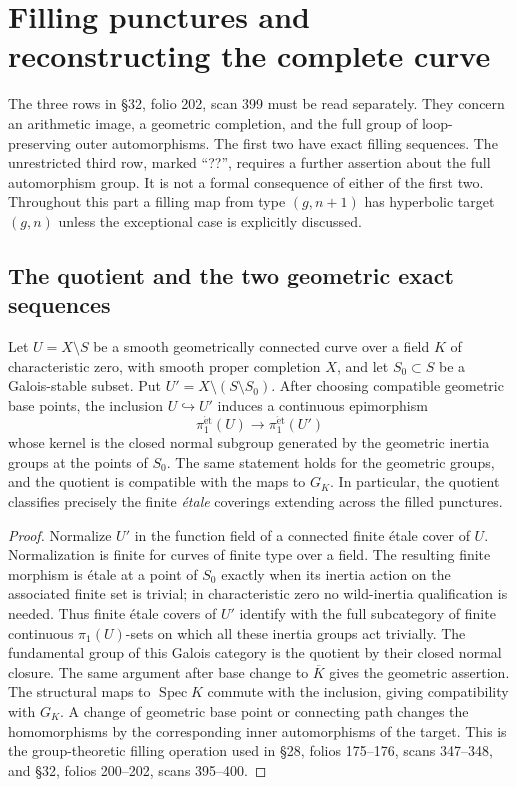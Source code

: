 \section{Filling punctures and reconstructing the complete curve}\label{part:C}

The three rows in \S32, folio 202, scan 399 must be read separately.
They concern an arithmetic image, a geometric completion, and the
full group of loop-preserving outer automorphisms.  The first two
have exact filling sequences.  The unrestricted third row, marked
``??'', requires a further assertion about the full automorphism
group.  It is not a formal consequence of either of the first two.
Throughout this part a filling map from type $(g,n+1)$ has hyperbolic
target $(g,n)$ unless the exceptional case is explicitly discussed.

\subsection{The quotient and the two geometric exact sequences}

Let $U=X\setminus S$ be a smooth geometrically connected curve over
a field $K$ of characteristic zero, with smooth proper completion
$X$, and let $S_0\subset S$ be a Galois-stable subset.  Put
$U'=X\setminus(S\setminus S_0)$.  After choosing compatible
geometric base points, the inclusion $U\hookrightarrow U'$ induces
a continuous epimorphism
\[
 \pi_1^{\mathrm{\acute et}}(U)\longrightarrow
 \pi_1^{\mathrm{\acute et}}(U')
\]
whose kernel is the closed normal subgroup generated by the
geometric inertia groups at the points of $S_0$.  The same statement
holds for the geometric groups, and the quotient is compatible
with the maps to $G_K$.  In particular, the quotient classifies
precisely the finite \emph{\'etale} coverings extending across the
filled punctures.

\begin{proof}
Normalize $U'$ in the function field of a connected finite \'etale
cover of $U$.  Normalization is finite for curves of finite type
over a field.  The resulting finite morphism is \'etale at a point
of $S_0$ exactly when its inertia action on the associated finite
set is trivial; in characteristic zero no wild-inertia qualification
is needed.  Thus finite \'etale covers of $U'$ identify with the
full subcategory of finite continuous $\pi_1(U)$-sets on which all
these inertia groups act trivially.  The fundamental group of
this Galois category is the quotient by their closed normal
closure.  The same argument after base change to $\overline K$
gives the geometric assertion.  The structural maps to
$\operatorname{Spec}K$ commute with the inclusion, giving
compatibility with $G_K$.  A change of geometric base point or
connecting path changes the homomorphisms by the corresponding
inner automorphisms of the target.  This is the group-theoretic
filling operation used in \S28, folios 175--176, scans 347--348,
and \S32, folios 200--202, scans 395--400.
\end{proof}

